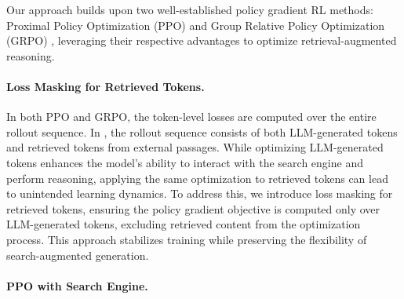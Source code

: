 

Our approach builds upon two well-established policy gradient RL methods: Proximal Policy Optimization (PPO) \citep{schulman2017proximal} and Group Relative Policy Optimization (GRPO) \citep{shao2024deepseekmath,guo2025deepseek}, leveraging their respective advantages to optimize retrieval-augmented reasoning.

\paragraph{Loss Masking for Retrieved Tokens.}\label{sec:kl-mask}

In both PPO and GRPO, the token-level losses are computed over the entire rollout sequence. In \Ours, the rollout sequence consists of both LLM-generated tokens and retrieved tokens from external passages.
While optimizing LLM-generated tokens enhances the model’s ability to interact with the search engine and perform reasoning, applying the same optimization to retrieved tokens can lead to unintended learning dynamics. To address this, we introduce loss masking for retrieved tokens, ensuring the policy gradient objective is computed only over LLM-generated tokens, excluding retrieved content from the optimization process. This approach stabilizes training while preserving the flexibility of search-augmented generation.

\paragraph{PPO with Search Engine.}

